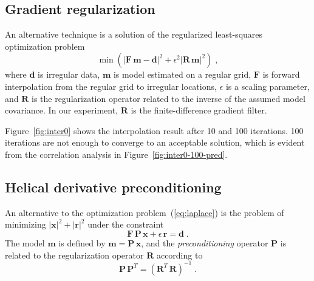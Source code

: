 
\subsection{Gradient regularization}

An alternative technique is a solution of the regularized
least-squares optimization problem
\begin{equation}
\label{eq:laplace}
\min\left( |\mathbf{F}\,\mathbf{m} - \mathbf{d}|^2 + \epsilon^2 |\mathbf{R}\,\mathbf{m}|^2\right)\;,
\end{equation}
where $\mathbf{d}$ is irregular data, $\mathbf{m}$ is model estimated
on a regular grid, $\mathbf{F}$ is forward interpolation from the
regular grid to irregular locations, $\epsilon$ is a scaling
parameter, and $\mathbf{R}$ is the regularization operator related to
the inverse of the assumed model covariance. In our experiment,
$\mathbf{R}$ is the finite-difference gradient filter.


Figure~\ref{fig:inter0} shows the interpolation result after 10 and
100 iterations. 100 iterations are not enough to converge to an
acceptable solution, which is evident from the correlation analysis in
Figure~\ref{fig:inter0-100-pred}.


\subsection{Helical derivative preconditioning}

An alternative to the optimization problem~(\ref{eq:laplace}) is the
problem of minimizing $|\mathbf{x}|^2+|\mathbf{r}|^2$ under the
constraint 
\begin{equation}
\label{eq:precon}
\mathbf{F}\,\mathbf{P}\,\mathbf{x} + \epsilon\,\mathbf{r} = \mathbf{d}\;.
\end{equation}
The model $\mathbf{m}$ is defined by
$\mathbf{m}=\mathbf{P}\,\mathbf{x}$, and the \emph{preconditioning}
operator $\mathbf{P}$ is related to the regularization operator
$\mathbf{R}$ according to
\begin{equation}
\label{eq:covar}
\mathbf{P}\,\mathbf{P}^T = \left(\mathbf{R}^T\,\mathbf{R}\right)^{-1}\;.        
\end{equation}

